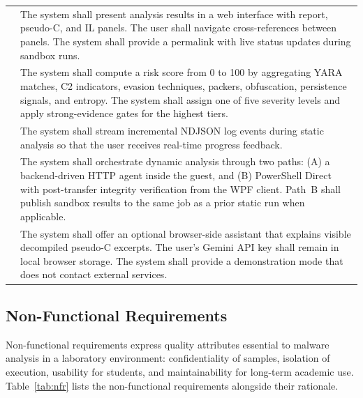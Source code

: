 \begin{xltabular}{\linewidth}{@{}>{\raggedright\arraybackslash}p{1.5cm}Y@{}}
 &
The system shall present analysis results in a web interface with report, pseudo-C, and IL panels.
The user shall navigate cross-references between panels. The system shall provide a permalink with
live status updates during sandbox runs. \\
 &
The system shall compute a risk score from 0 to 100 by aggregating YARA matches, C2 indicators,
evasion techniques, packers, obfuscation, persistence signals, and entropy. The system shall
assign one of five severity levels and apply strong-evidence gates for the highest tiers. \\
 &
The system shall stream incremental NDJSON log events during static analysis so that the user
receives real-time progress feedback. \\
 &
The system shall orchestrate dynamic analysis through two paths: (A) a backend-driven HTTP agent
inside the guest, and (B) PowerShell Direct with post-transfer integrity verification from the WPF
client. Path~B shall publish sandbox results to the same job as a prior static run when applicable. \\
 &
The system shall offer an optional browser-side assistant that explains visible decompiled
pseudo-C excerpts. The user's Gemini API key shall remain in local browser storage. The system
shall provide a demonstration mode that does not contact external services. \\
\bottomrule
\end{xltabular}
\normalsize

\subsection{Non-Functional Requirements}

Non-functional requirements express quality attributes essential to malware analysis in a
laboratory environment: confidentiality of samples, isolation of execution, usability for students,
and maintainability for long-term academic use. Table~\ref{tab:nfr} lists the non-functional
requirements alongside their rationale.

